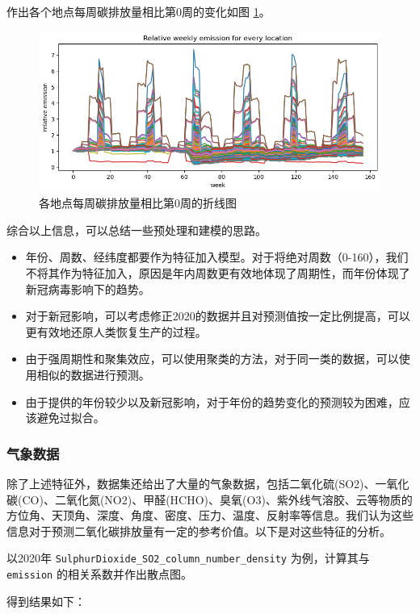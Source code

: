 \documentclass{ctexart}
\begin{document}
作出各个地点每周碳排放量相比第0周的变化如图 \ref{fig:6}。

\begin{figure}[H]
      \centering
      \includegraphics[width=1\textwidth]{output6.png}
      \caption{各地点每周碳排放量相比第0周的折线图}
      \label{fig:6}
\end{figure}

综合以上信息，可以总结一些预处理和建模的思路。
\begin{itemize}
      \item 年份、周数、经纬度都要作为特征加入模型。对于将绝对周数（0-160），我们不将其作为特征加入，原因是年内周数更有效地体现了周期性，而年份体现了新冠病毒影响下的趋势。
      \item 对于新冠影响，可以考虑修正2020的数据并且对预测值按一定比例提高，可以更有效地还原人类恢复生产的过程。
      \item 由于强周期性和聚集效应，可以使用聚类的方法，对于同一类的数据，可以使用相似的数据进行预测。
      \item 由于提供的年份较少以及新冠影响，对于年份的趋势变化的预测较为困难，应该避免过拟合。
\end{itemize}

\subsubsection{气象数据}

除了上述特征外，数据集还给出了大量的气象数据，包括二氧化硫(SO2)、一氧化碳(CO)、二氧化氮(NO2)、甲醛(HCHO)、臭氧(O3)、紫外线气溶胶、云等物质的方位角、天顶角、深度、角度、密度、压力、温度、反射率等信息。我们认为这些信息对于预测二氧化碳排放量有一定的参考价值。以下是对这些特征的分析。

以2020年 \texttt{SulphurDioxide\_SO2\_column\_number\_density} 为例，计算其与 \texttt{emission} 的相关系数并作出散点图。

得到结果如下：
\end{document}
